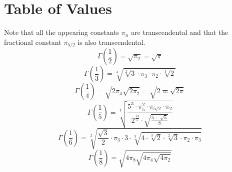 \documentclass[sn-mathphys]{sn-jnl}%
\theoremstyle{thmstyleone}%
\theoremstyle{thmstyletwo}%
\theoremstyle{thmstylethree}%
\begin{document}
\section{Table of Values}
Note that all the appearing constants $\pi_n$ are transcendental and that the fractional constant $\pi_{5/2}$ is also transcendental.
\begin{equation}
\Gamma(\frac{1}{2}) = \sqrt{\pi_2} = \sqrt{\pi}
\end{equation}
\begin{equation}
\Gamma(\frac{1}{3}) = \sqrt[3]{\sqrt[2]{3} \cdot \pi_{3} \cdot \pi_{2} \cdot \sqrt[3]{2}}
\end{equation}
\begin{equation}
\Gamma(\frac{1}{4}) = \sqrt{2 \pi_4 \sqrt{2\pi_2}} = \sqrt{2 \varpi \sqrt{2\pi}}
\end{equation}
\begin{equation}
\Gamma(\frac{1}{5}) = \sqrt[5]{\frac{5^3 \cdot \pi_{5}^{2} \cdot \pi_{5/2} \cdot \pi_2}{2^{\frac{13}{5}} \cdot \sqrt{\frac{5 - \sqrt{5}}{8}}}}
\end{equation}
\begin{equation}
\Gamma(\frac{1}{6}) = \sqrt[2]{\frac{\sqrt{3}}{2} \cdot {\pi_3} \cdot 3 \cdot \sqrt[3]{4 \cdot \sqrt[3]{2} \cdot \sqrt[2]{3} \cdot \pi_2 \cdot \pi_3}}
\end{equation}
\begin{equation}
\Gamma(\frac{1}{8}) = \sqrt{4 \pi_8 \sqrt{4 \pi_4 \sqrt{4\pi_2}}}
\end{equation}
\end{document}
